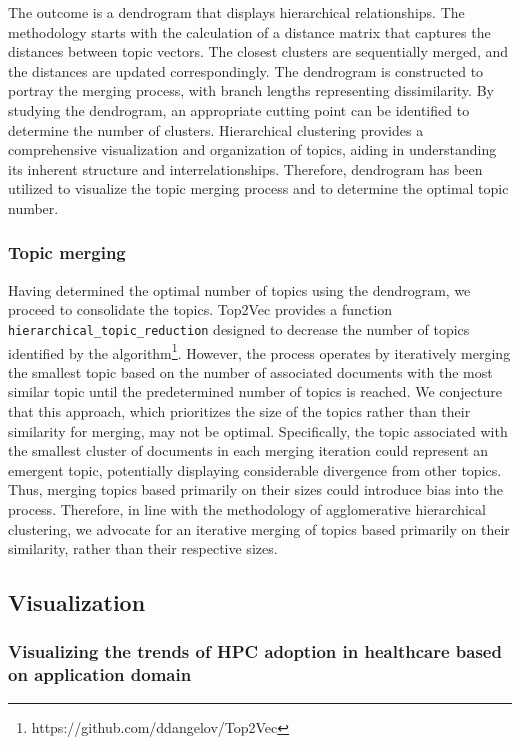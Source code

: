 The outcome is a dendrogram that displays hierarchical relationships. The methodology starts with the calculation of a distance matrix that captures the distances between topic vectors. The closest clusters are sequentially merged, and the distances are updated correspondingly. The dendrogram is constructed to portray the merging process, with branch lengths representing dissimilarity. By studying the dendrogram, an appropriate cutting point can be identified to determine the number of clusters. Hierarchical clustering provides a comprehensive visualization and organization of topics, aiding in understanding its inherent structure and interrelationships. Therefore, dendrogram has been utilized to visualize the topic merging process and to determine the optimal topic number.


\subsubsection{Topic merging}\label{subsubse:2-2.3.4}

Having determined the optimal number of topics using the dendrogram, we proceed to consolidate the topics. Top2Vec provides a function \texttt{hierarchical\_topic\_reduction} designed to decrease the number of topics identified by the algorithm\footnote[3]{https://github.com/ddangelov/Top2Vec}. However, the process operates by iteratively merging the smallest topic based on the number of associated documents with the most similar topic until the predetermined number of topics is reached. We conjecture that this approach, which prioritizes the size of the topics rather than their similarity for merging, may not be optimal. Specifically, the topic associated with the smallest cluster of documents in each merging iteration could represent an emergent topic, potentially displaying considerable divergence from other topics. Thus, merging topics based primarily on their sizes could introduce bias into the process. Therefore, in line with the methodology of agglomerative hierarchical clustering, we advocate for an iterative merging of topics based primarily on their similarity, rather than their respective sizes.

\subsection{Visualization }\label{subse:2-2.4}


\subsubsection{Visualizing the trends of HPC adoption in healthcare based on application domain}\label{subsubse:2-2.4.1}


